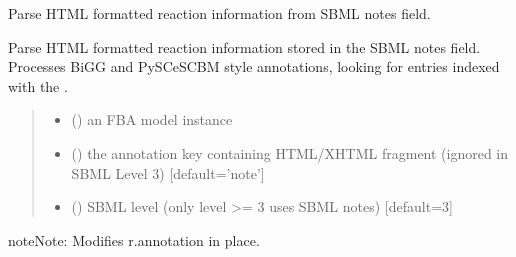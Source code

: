 \documentclass[letterpaper,12pt,english]{sphinxmanual}
\begin{document}

\begin{fulllineitems}
\label{\detokenize{api/core:cbmpy.CBTools.processSBMLAnnotationNotes}}
\pysigstartsignatures
\pysiglinewithargsret
{}
{\sphinxparamcomma {}\sphinxparamcomma {}}
{}
\pysigstopsignatures
\sphinxAtStartPar
Parse HTML formatted reaction information from SBML notes field.

\sphinxAtStartPar
Parse HTML formatted reaction information stored in the SBML notes field.
Processes BiGG and PySCeSCBM style annotations, looking for entries indexed
with the .
\begin{quote}\begin{description}
\begin{itemize}
\item {} 
\sphinxAtStartPar
{} () \textendash{} an FBA model instance

\item {} 
\sphinxAtStartPar
{} (\sphinxstyleliteralemphasis{\sphinxupquote{, }}) \textendash{} the annotation key containing HTML/XHTML
fragment (ignored in SBML Level 3) {[}default=’note’{]}

\item {} 
\sphinxAtStartPar
{} (\sphinxstyleliteralemphasis{\sphinxupquote{, }}) \textendash{} SBML level (only level \textgreater{}= 3 uses SBML notes) {[}default=3{]}

\end{itemize}

\end{description}\end{quote}

\begin{sphinxadmonition}{note}{Note:}
\sphinxAtStartPar
Modifies r.annotation in place.
\end{sphinxadmonition}

\end{fulllineitems}
\end{document}

